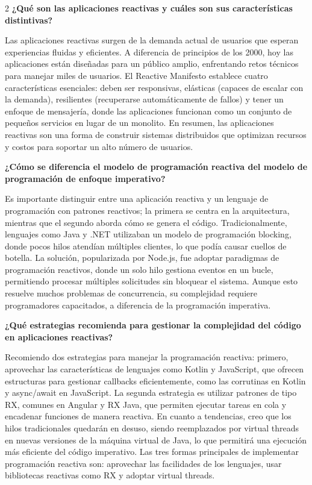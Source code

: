 \documentclass[12pt,spanish,Letterpaper,openany]{book}
\begin{document}
\begin {multicols}{2}
\textbf{¿Qué son las aplicaciones reactivas y cuáles son sus características distintivas?}

Las aplicaciones reactivas surgen de la demanda actual de usuarios que esperan experiencias fluidas y eficientes. A diferencia de principios de los 2000, hoy las aplicaciones están diseñadas para un público amplio, enfrentando retos técnicos para manejar miles de usuarios. El Reactive Manifesto establece cuatro características esenciales: deben ser responsivas, elásticas (capaces de escalar con la demanda), resilientes (recuperarse automáticamente de fallos) y tener un enfoque de mensajería, donde las aplicaciones funcionan como un conjunto de pequeños servicios en lugar de un monolito. En resumen, las aplicaciones reactivas son una forma de construir sistemas distribuidos que optimizan recursos y costos para soportar un alto número de usuarios.

\textbf{¿Cómo se diferencia el modelo de programación reactiva del modelo de programación de enfoque imperativo?}

Es importante distinguir entre una aplicación reactiva y un lenguaje de programación con patrones reactivos; la primera se centra en la arquitectura, mientras que el segundo aborda cómo se genera el código. Tradicionalmente, lenguajes como Java y .NET utilizaban un modelo de programación blocking, donde pocos hilos atendían múltiples clientes, lo que podía causar cuellos de botella. La solución, popularizada por Node.js, fue adoptar paradigmas de programación reactivos, donde un solo hilo gestiona eventos en un bucle, permitiendo procesar múltiples solicitudes sin bloquear el sistema. Aunque esto resuelve muchos problemas de concurrencia, su complejidad requiere programadores capacitados, a diferencia de la programación imperativa.

\bigskip
\bigskip
\bigskip
\bigskip
\bigskip
\bigskip

\textbf{¿Qué estrategias recomienda para gestionar la complejidad del código en aplicaciones reactivas?}

Recomiendo dos estrategias para manejar la programación reactiva: primero, aprovechar las características de lenguajes como Kotlin y JavaScript, que ofrecen estructuras para gestionar callbacks eficientemente, como las corrutinas en Kotlin y async/await en JavaScript. La segunda estrategia es utilizar patrones de tipo RX, comunes en Angular y RX Java, que permiten ejecutar tareas en cola y encadenar funciones de manera reactiva. En cuanto a tendencias, creo que los hilos tradicionales quedarán en desuso, siendo reemplazados por virtual threads en nuevas versiones de la máquina virtual de Java, lo que permitirá una ejecución más eficiente del código imperativo. Las tres formas principales de implementar programación reactiva son: aprovechar las facilidades de los lenguajes, usar bibliotecas reactivas como RX y adoptar virtual threads.


\end{multicols}
\end{document}
